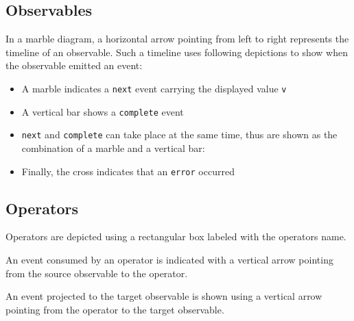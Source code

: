 \subsection*{Observables}

In a marble diagram, a horizontal arrow  pointing from left to right represents the timeline of an observable. Such a timeline uses following depictions to show when the observable emitted an event:

\begin{itemize}
  \item A marble  indicates a \texttt{next} event carrying the displayed value \texttt{v}
  \item A vertical bar  shows a \texttt{complete} event
  \item \texttt{next} and \texttt{complete} can take place at the same time, thus are shown as the combination of a marble and a vertical bar: 
  \item Finally, the cross  indicates that an \texttt{error} occurred
\end{itemize}

\subsection*{Operators}

Operators are depicted using a rectangular box  labeled with the operators name.

An event consumed by an operator is indicated with a vertical arrow  pointing from the source observable to the operator.

An event projected to the target observable is shown using a vertical arrow  pointing from the operator to the target observable.


